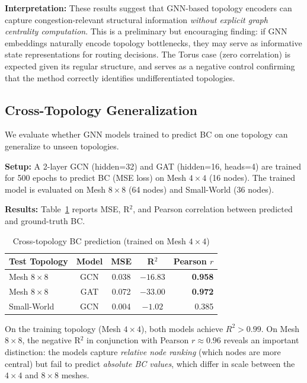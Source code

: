\documentclass[conference]{IEEEtran}
\begin{document}
\textbf{Interpretation:} These results suggest that GNN-based topology encoders can capture congestion-relevant structural information \emph{without explicit graph centrality computation}. This is a preliminary but encouraging finding: if GNN embeddings naturally encode topology bottlenecks, they may serve as informative state representations for routing decisions. The Torus case (zero correlation) is expected given its regular structure, and serves as a negative control confirming that the method correctly identifies undifferentiated topologies.

\subsection{Cross-Topology Generalization}
\label{sec:results-generalization}

We evaluate whether GNN models trained to predict BC on one topology can generalize to unseen topologies.

\textbf{Setup:} A 2-layer GCN (hidden=32) and GAT (hidden=16, heads=4) are trained for 500 epochs to predict BC (MSE loss) on Mesh $4\times4$ (16 nodes). The trained model is evaluated on Mesh $8\times8$ (64 nodes) and Small-World (36 nodes).

\textbf{Results:} Table~\ref{tab:generalization} reports MSE, R$^2$, and Pearson correlation between predicted and ground-truth BC.

\begin{table}[h]
\centering
\caption{Cross-topology BC prediction (trained on Mesh $4\times4$)}
\label{tab:generalization}
\small
\begin{tabular}{lcccr}
\toprule
\textbf{Test Topology} & \textbf{Model} & \textbf{MSE} & \textbf{R$^2$} & \textbf{Pearson $r$} \\
\midrule
Mesh $8\times8$ & GCN & 0.038 & $-16.83$ & \textbf{0.958} \\
Mesh $8\times8$ & GAT & 0.072 & $-33.00$ & \textbf{0.972} \\
Small-World & GCN & 0.004 & $-1.02$ & 0.385 \\
\bottomrule
\end{tabular}
\end{table}

On the training topology (Mesh $4\times4$), both models achieve $R^2 > 0.99$. On Mesh $8\times8$, the negative R$^2$ in conjunction with Pearson $r \approx 0.96$ reveals an important distinction: the models capture \emph{relative node ranking} (which nodes are more central) but fail to predict \emph{absolute BC values}, which differ in scale between the $4\times4$ and $8\times8$ meshes.
\end{document}
